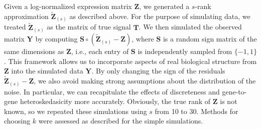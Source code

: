 \documentclass[10pt,letterpaper]{article}
\begin{document}
Given a log-normalized expression matrix $\mathbf{Z}$, we generated a $s$-rank approximation $\mathbf{\tilde Z}_{(s)}$ as described above.
For the purpose of simulating data, we treated $\mathbf{\tilde Z}_{(s)}$ as the matrix of true signal $\mathbf{T}$.
We then simulated the observed matrix $\mathbf{Y}$ by computing $\mathbf{S} \circ (\mathbf{\tilde Z}_{(s)} - \mathbf{Z})$,
where $\mathbf{S}$ is a random sign matrix of the same dimensions as $\mathbf{Z}$, i.e., each entry of $\mathbf{S}$ is independently sampled from $\{-1, 1\}$.
This framework allows us to incorporate aspects of real biological structure from $\mathbf{Z}$ into the simulated data $\mathbf{Y}$.
By only changing the sign of the residuals $\mathbf{\tilde Z}_{(s)} - \mathbf{Z}$, we also avoid making strong assumptions about the distribution of the noise.
In particular, we can recapitulate the effects of discreteness and gene-to-gene heteroskedasicity more accurately.
Obviously, the true rank of $\mathbf{Z}$ is not known, so we repeated these simulations using $s$ from 10 to 30.
Methods for choosing $k$ were assessed as described for the simple simulations.




\end{document}
